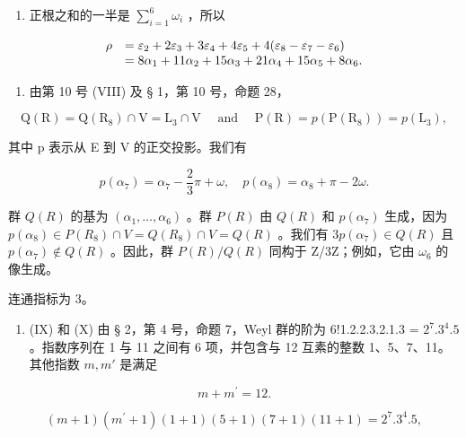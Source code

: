 \begin{enumerate}
\def\labelenumi{(\Roman{enumi})}
\setcounter{enumi}{6}
\tightlist
\item
  正根之和的一半是 \(\sum_{i=1}^{6} \omega_i\) ，所以
\end{enumerate}

\[
\begin{array}{r l} \rho & = \varepsilon_ {2} + 2 \varepsilon_ {3} + 3 \varepsilon_ {4} + 4 \varepsilon_ {5} + 4 (\varepsilon_ {8} - \varepsilon_ {7} - \varepsilon_ {6}) \\ & = 8 \alpha_ {1} + 11 \alpha_ {2} + 15 \alpha_ {3} + 21 \alpha_ {4} + 15 \alpha_ {5} + 8 \alpha_ {6}. \end{array}
\]

\begin{enumerate}
\def\labelenumi{(\Roman{enumi})}
\setcounter{enumi}{7}
\tightlist
\item
  由第 10 号 (VIII) 及 § 1，第 10 号，命题 28，
\end{enumerate}

\[
\mathrm{Q} (\mathrm{R}) = \mathrm{Q} (\mathrm{R} _ {8}) \cap \mathrm{V} = \mathrm{L} _ {3} \cap \mathrm{V} \quad \text { and } \quad \mathrm{P} (\mathrm{R}) = p (\mathrm{P} (\mathrm{R} _ {8})) = p (\mathrm{L} _ {3}),
\]

其中 p 表示从 E 到 V 的正交投影。我们有

\[
p (\alpha_ {7}) = \alpha_ {7} - \frac {2}{3} \pi + \omega , \quad p (\alpha_ {8}) = \alpha_ {8} + \pi - 2 \omega .
\]

群 \(Q(R)\) 的基为 \((\alpha_{1},\ldots,\alpha_{6})\) 。群 \(P(R)\) 由 \(Q(R)\) 和 \(p(\alpha_{7})\) 生成，因为 \(p(\alpha_{8})\in P(R_{8})\cap V=Q(R_{8})\cap V=Q(R)\) 。我们有 \(3p(\alpha_{7})\in Q(R)\) 且 \(p(\alpha_{7})\notin Q(R)\) 。因此，群 \(P(R)/Q(R)\) 同构于 Z/3Z；例如，它由 \(\omega_{6}\) 的像生成。

连通指标为 3。

\begin{enumerate}
\def\labelenumi{(\Roman{enumi})}
\setcounter{enumi}{8}
\tightlist
\item
  (IX) 和 (X) 由 § 2，第 4 号，命题 7，Weyl 群的阶为 6!1.2.2.3.2.1.3 = \(2^{7}.3^{4}.5\) 。指数序列在 1 与 11 之间有 6 项，并包含与 12 互素的整数 1、5、7、11。其他指数 \(m, m'\) 是满足
\end{enumerate}

\[
m + m ^ {\prime} = 12.
\]

\[
(m + 1) \left(m ^ {\prime} + 1\right) (1 + 1) (5 + 1) (7 + 1) (11 + 1) = 2 ^ {7}. 3 ^ {4}. 5,
\]

